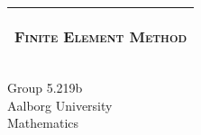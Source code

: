 %
%
%
%
%
\begin{titlepage}
  \addtolength{\hoffset}{0.5\evensidemargin-0.5\oddsidemargin} %
  \noindent%
  \begin{tabular}{@{}p{\textwidth}@{}}
    \toprule[2pt]
    \midrule
    \vspace{0.4cm}
    \begin{center}
    \Huge{\textsc{Finite Element Method}}
    \end{center}
    \vspace{0.4cm}
   \begin{center}
    \Large{\textsc{}}%
    \end{center}
    \vspace{0.4cm}\\
    \midrule
    \toprule[2pt]
  \end{tabular}
  \vspace{0.8cm}
  \setlength\fboxsep{0pt}
    \setlength\fboxsep{5pt}
  \vfill
\begin{center}
  {\large{Group 5.219b} \\
    {Aalborg University} \\
    {Mathematics} \\}
\end{center}
  
\end{titlepage}
